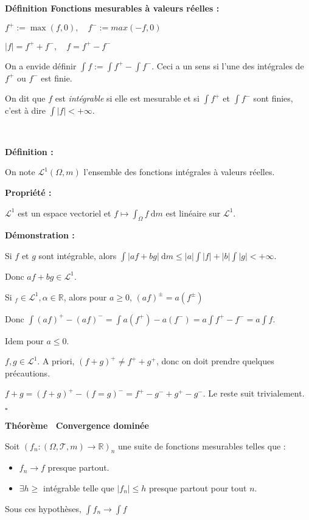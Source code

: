 \documentclass[10pt,a4paper,notitlepage ]{report}
\newcommand{\R}{\mathbb R}
\newcommand{\T}{\mathcal T}
\newcommand{\dd}{\ \mathrm d}
\newcommand{\1}{\mathds 1}
\newcommand{\LL}{\mathcal L}
\newenvironment{definition}[1][]{
	
	\textbf{Définition #1 : }
}
{}
\newcounter{th}
\newenvironment{theorem}[1][]{
\refstepcounter{th}
\begin{tcolorbox}
	\textbf{Théorème \theth \ #1}
	
	
}{\end{tcolorbox}}
\newenvironment{propriete}[1][]{
	\begin{tcolorbox}
		\textbf{Propriété #1 : }
}
{\end{tcolorbox}}
\newenvironment{demo}[1][]{

	\textbf{Démonstration #1 :}
}{\begin{flushright}
	$\square$
\end{flushright}
}
\begin{document}
\begin{definition}[Fonctions mesurables à valeurs réelles]
	
	$f^+ := \max(f,0), \quad f^- := max(-f, 0)$
	
	$|f| = f^+ + f^-, \quad f=f^+-f^-$
	
	On a envide définir $\int f := \int f^+ - \int f^-$. Ceci a un sens si l'une des intégrales de $f^+$ ou $f^-$ est finie.
	
	On dit que $f$ est \emph{intégrable} si elle est mesurable et si $\int f^+$ et $\int f^-$ sont finies, c'est à dire $\int|f| < +\infty$.
\end{definition}

\.\\

\begin{definition}
	On note $\mathcal L^1(\Omega,m)$ l'ensemble des fonctions intégrales à valeurs réelles.
\end{definition}

\begin{propriete}
	$\mathcal L^1$ est un espace vectoriel et $f\mapsto \int_\Omega f \dd m$ est linéaire sur $\mathcal L^1$.
\end{propriete}

\begin{demo}
	Si $f$ et $g$ sont intégrable, alors $\int|af+bg| \dd m \le |a|\int|f| + |b|\int|g| < + \infty$.

	Donc $af+bg \in \mathcal L^1$.

	Si $_f\in\mathcal L^1, \alpha\in \R$, alors pour $a\ge 0$, $(af)^\pm = a(f^\pm)$
	
	Donc $\int(af)^+ - (af)^- = \int a(f^+) - a(f^-) = a \int f^+-f^- = a\int f$.
	
	Idem pour $a\le 0$.
	
	$f,g\in \LL^1$. A priori, $(f+g)^+ \neq f^+ + g^+$, donc on doit prendre quelques précautions.
	
	$f+g = (f+g)^+ - (f=g)^- = f^+ - g^- + g^+ - g^-$. Le reste suit trivialement.
	
\end{demo}

\begin{theorem}[Convergence dominée]
	Soit $(f_n : (\Omega, \T, m) \rightarrow \R)_n$ une suite de fonctions mesurables telles que :
	\begin{itemize}
		\item $f_n \rightarrow f$ presque partout.
		\item $\exists h\ge$ intégrable telle que $|f_n| \le h$ presque partout pour tout $n$.
	\end{itemize}

	Sous ces hypothèses, $\int f_n \rightarrow \int f$
\end{theorem}
\end{document}
